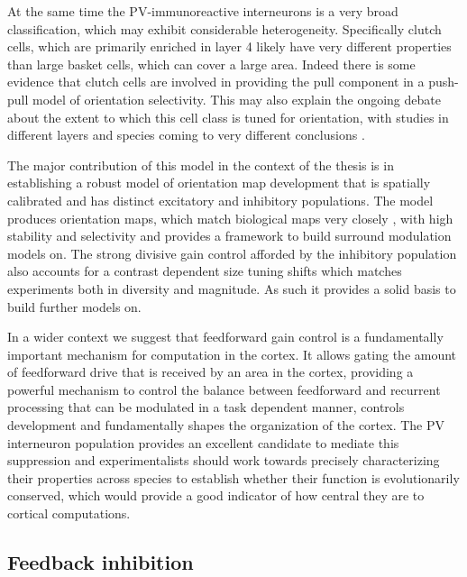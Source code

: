 At the same time the PV-immunoreactive interneurons is a very broad
classification, which may exhibit considerable
heterogeneity. Specifically clutch cells, which are primarily enriched
in layer 4 likely have very different properties than large basket
cells, which can cover a large area. Indeed there is some evidence
that clutch cells are involved in providing the pull component in a
push-pull model of orientation selectivity. This may also explain the
ongoing debate about the extent to which this cell class is tuned for
orientation, with studies in different layers and species coming to
very different conclusions \citep{Cardin2007, Ma2011, Hofer2011}.

The major contribution of this model in the context of the thesis is
in establishing a robust model of orientation map development that is
spatially calibrated and has distinct excitatory and inhibitory
populations. The model produces orientation maps, which match
biological maps very closely \citep{Kaschube2010, Stevens2013}, with
high stability and selectivity and provides a framework to build
surround modulation models on. The strong divisive gain control
afforded by the inhibitory population also accounts for a contrast
dependent size tuning shifts which matches experiments both in
diversity and magnitude. As such it provides a solid basis to build
further models on.

In a wider context we suggest that feedforward gain control is a
fundamentally important mechanism for computation in the cortex. It
allows gating the amount of feedforward drive that is received by an
area in the cortex, providing a powerful mechanism to control the
balance between feedforward and recurrent processing that can be
modulated in a task dependent manner, controls development and
fundamentally shapes the organization of the cortex. The PV
interneuron population provides an excellent candidate to mediate this
suppression and experimentalists should work towards precisely
characterizing their properties across species to establish whether
their function is evolutionarily conserved, which would provide a good
indicator of how central they are to cortical computations.

\subsection{Feedback inhibition}

